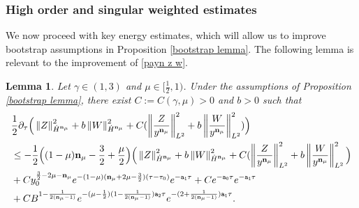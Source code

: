 \documentclass{article}
\newcommand{\norm}[1]{\left\lVert#1\right\rVert}
\newcommand{\ga}{\gamma}
\newcommand{\pa}{\partial}
\def\beqa{\begin{equation}\begin{aligned}}
\def\eeqa{\end{aligned}\end{equation}}
\def\espz{Z}
\def\espw{W}
\def\epone{\mathtt{a_1}}
\def\eptwo{\mathtt{a_2}}
\def\epzero{\mathtt{a_0}}
\def\ndmu{{\bf{n}_{\mu}}}
\numberwithin{equation}{section}
\newtheorem{lemma}[theorem]{Lemma}
\begin{document}
\subsubsection{High order and singular weighted estimates}

We now proceed with key energy estimates, which will allow us to improve bootstrap assumptions in Proposition \ref{bootstrap lemma}. The following lemma is relevant to the improvement of \eqref{payn z w}. 

\begin{lemma}\label{ode Hn}
	Let $\ga\in(1,3)$ and $\mu\in[\frac12,1)$. Under the assumptions of Proposition  \ref{bootstrap lemma}, there exist $C:=C(\ga,\mu)>0$ and $b>0$ such that
	\beqa\label{Hn ineq}
		 &\frac12\pa_\tau \Big( \norm{\espz}_{\dot H^{\ndmu}}^2+b \norm{\espw}_{\dot H^{\ndmu}}^2 +  C(\norm{\frac{\espz}{y^{\ndmu}}}_{L^2}^2 + b\norm{\frac{\espw}{y^{\ndmu}}}_{L^2}^2) \Big)\\
	&\le   -\frac{1}{2}\Big((1-\mu)\ndmu - \frac32 + \frac{\mu}{2} \Big)\Big( \norm{\espz}_{\dot H^{\ndmu}}^2+ b\norm{\espw}_{\dot H^{\ndmu}} ^2 +C (\norm{\frac{\espz}{y^{\ndmu}}}_{L^2}^2 + b\norm{\frac{\espw}{y^{\ndmu}}}_{L^2}^2\Big) \\
    &+C y_0^{\frac32-2\mu-\ndmu} e ^{-(1-\mu)(\ndmu +2\mu -\frac{3}{2}) (\tau-\tau_0)} e^{-\epone \tau} +Ce^{-\epzero \tau}e^{-\epone \tau}\\
     &+ CB^{1-\frac{1}{2(\ndmu-1)}}e^{-(\mu-\frac12)(1-\frac{1}{2(\ndmu-1)})\eptwo\tau} e^{-(2+\frac{1}{2(\ndmu-1)})\epone \tau}.
	\eeqa
\end{lemma}
\end{document}
